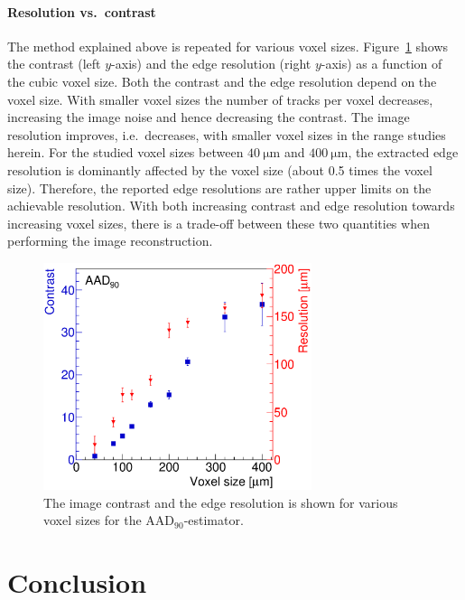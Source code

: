 \documentclass{PoS}
\newcommand{\aadninety}{\ensuremath{\textrm{AAD}_\textrm{90}}}
\begin{document}
\paragraph{Resolution vs.\ contrast}

The method explained above is repeated for various voxel sizes. 
Figure~\ref{fig:resovscontrast} shows the contrast (left $y$-axis) and the edge resolution (right $y$-axis) as a function of the cubic voxel size.
Both the contrast and the edge resolution depend on the voxel size. 
With smaller voxel sizes the number of tracks per voxel decreases, increasing the image noise and hence decreasing the contrast.
The image resolution improves, i.e.\ decreases, with smaller voxel sizes in the range studies herein. 
For the studied voxel sizes between $\SI{40}{\um}$ and $\SI{400}{\um}$, the extracted edge resolution is dominantly affected by the voxel size (about 0.5 times the voxel size). 
Therefore, the reported edge resolutions are rather upper limits on the achievable resolution. 
With both increasing contrast and edge resolution towards increasing voxel sizes, there is a trade-off between these two quantities when performing the image reconstruction. 


\begin{figure}[t!]
  \centering
  \includegraphics[width=0.70\textwidth]{figures/CRvsVS.eps}
    \caption[contrast]{%
    The image contrast and the edge resolution is shown for various voxel sizes for the $\aadninety$-estimator.}
  \label{fig:resovscontrast}
\end{figure}





\section{Conclusion}
\end{document}
